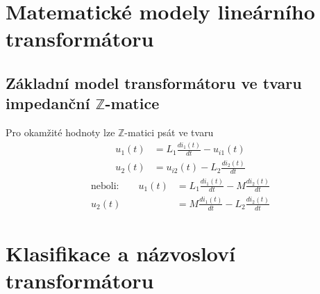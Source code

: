   \section{Matematické modely lineárního transformátoru}
    \subsection{Základní model transformátoru ve tvaru impedanční \(\mathbb{Z}\)-matice}  
      Pro okamžité hodnoty lze \(\mathbb{Z}\)-matici psát ve tvaru
      \begin{subequations}           
        \label{ES:eq_MatM01}
        \begin{align}
          u_1(t) &= L_1\frac{di_1(t)}{dt} - u_{i1}(t)  \label{ES:eq_MatM01a}\\
          u_2(t) &= u_{i2}(t) - L_2\frac{di_2(t)}{dt}  \label{ES:eq_MatM01b}
        \end{align}
      \end{subequations}
      \begin{subequations}
        \label{ES:eq_MatM02}
        \begin{align}
          \text{neboli:} \qquad u_1(t) &= L_1\frac{di_1(t)}{dt} 
                                          - M\frac{di_2(t)}{dt}  \label{ES:eq_MatM02a}      \\
                                u_2(t) &=   M\frac{di_1(t)}{dt} 
                                        - L_2\frac{di_2(t)}{dt}  \label{ES:eq_MatM02b}
        \end{align}
      \end{subequations}

  \section{Klasifikace a názvosloví transformátoru}
